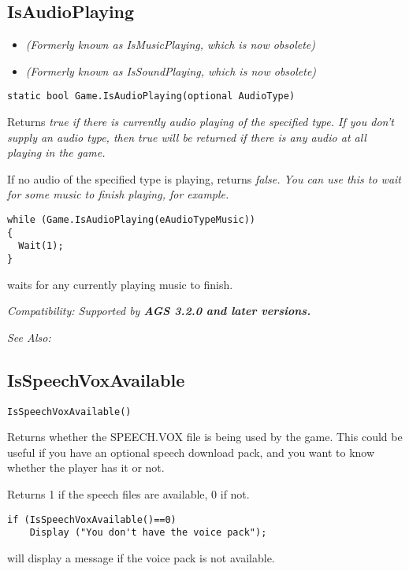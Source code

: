 \subsection{IsAudioPlaying}\label{Game.IsAudioPlaying}%

\begin{itemize}
\item \it{(Formerly known as IsMusicPlaying, which is now obsolete)}
\item \it{(Formerly known as IsSoundPlaying, which is now obsolete)}
\end{itemize}

\begin{verbatim}
static bool Game.IsAudioPlaying(optional AudioType)
\end{verbatim}
Returns \it{true} if there is currently audio playing of the specified type. If you don't
supply an audio type, then \it{true} will be returned if there is any audio at all playing
in the game.

If no audio of the specified type is playing, returns \it{false}. You can use this to wait
for some music to finish playing, for example.

\begin{verbatim}
while (Game.IsAudioPlaying(eAudioTypeMusic))
{
  Wait(1);
}
\end{verbatim}
waits for any currently playing music to finish.

\it{Compatibility:} Supported by \bf{AGS 3.2.0} and later versions.

\it{See Also:} 


\subsection{IsSpeechVoxAvailable}\label{IsSpeechVoxAvailable}%

\begin{verbatim}
IsSpeechVoxAvailable()
\end{verbatim}
Returns whether the SPEECH.VOX file is being used by the game.
This could be useful if you have an optional speech download pack, and
you want to know whether the player has it or not.

Returns 1 if the speech files are available, 0 if not.

\begin{verbatim}
if (IsSpeechVoxAvailable()==0)
    Display ("You don't have the voice pack");
\end{verbatim}
will display a message if the voice pack is not available.

